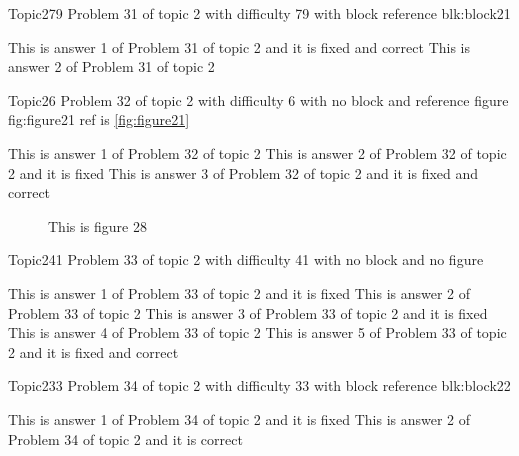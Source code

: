 \documentclass[master]{exam}
\begin{document}
\begin{problem}[requires=blk:block21]{Topic2}{79}
	Problem 31 of topic 2 with difficulty 79 with block reference blk:block21
	\begin{answers}
		 This is answer 1 of Problem 31 of topic 2 and it is fixed and correct
		\answer This is answer 2 of Problem 31 of topic 2 
	\end{answers}
\end{problem}

\begin{problem}{Topic2}{6}
	Problem 32 of topic 2 with difficulty 6 with no block and reference figure fig:figure21 ref is \ref{fig:figure21}
	\begin{answers}
		\answer This is answer 1 of Problem 32 of topic 2 
		\answer[fixed] This is answer 2 of Problem 32 of topic 2 and it is fixed
		 This is answer 3 of Problem 32 of topic 2 and it is fixed and correct
	\end{answers}
\end{problem}



\begin{figure}
	\begin{center}
		This is figure 28 
		\label{fig:figure28}
	\end{center}
\end{figure}

\begin{problem}{Topic2}{41}
	Problem 33 of topic 2 with difficulty 41 with no block and no figure
	\begin{answers}
		\answer[fixed] This is answer 1 of Problem 33 of topic 2 and it is fixed
		\answer This is answer 2 of Problem 33 of topic 2 
		\answer[fixed] This is answer 3 of Problem 33 of topic 2 and it is fixed
		\answer This is answer 4 of Problem 33 of topic 2 
		 This is answer 5 of Problem 33 of topic 2 and it is fixed and correct
	\end{answers}
\end{problem}

\begin{problem}[requires=blk:block22]{Topic2}{33}
	Problem 34 of topic 2 with difficulty 33 with block reference blk:block22
	\begin{answers}
		\answer[fixed] This is answer 1 of Problem 34 of topic 2 and it is fixed
		\answer[correct] This is answer 2 of Problem 34 of topic 2 and it is correct
	\end{answers}
\end{problem}
\end{document}
